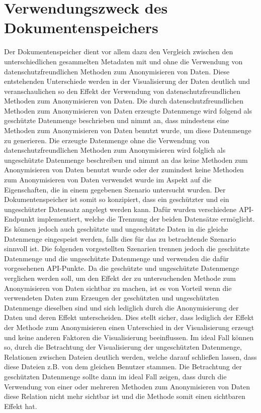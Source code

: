 \documentclass[
    fontsize=12pt,
    headings=small,
    parskip=half,           %
    bibliography=totoc,
    numbers=noenddot,       %
    open=any,               %
    ]{scrreprt}
\begin{document}
\section{Verwendungszweck des Dokumentenspeichers}
Der Dokumentenspeicher dient vor allem dazu den Vergleich zwischen den unterschiedlichen gesammelten Metadaten mit und ohne die Verwendung von datenschutzfreundlichen Methoden zum Anonymisieren von Daten. 
Diese entstehenden Unterschiede werden in der Visualisierung der Daten deutlich und veranschaulichen so den Effekt der Verwendung von datenschutzfreundlichen Methoden zum Anonymisieren von Daten.
Die durch datenschutzfreundlichen Methoden zum Anonymisieren von Daten erzeugte Datenmenge wird folgend als geschützte Datenmenge beschrieben und nimmt an, dass mindestens eine Methoden zum Anonymisieren von Daten benutzt wurde, um diese Datenmenge zu generieren. 
Die erzeugte Datenmenge ohne die Verwendung von datenschutzfreundlichen Methoden zum Anonymisieren wird folglich als ungeschützte Datenmenge beschreiben und nimmt an das keine Methoden zum Anonymisieren von Daten benutzt wurde oder der zumindest keine Methoden zum Anonymisieren von Daten verwendet wurde im Aspekt auf die Eigenschaften, die in einem gegebenen Szenario untersucht wurden.
Der Dokumentenspeicher ist somit so konzipiert, dass ein geschützter und ein ungeschützter Datensatz angelegt werden kann. 
Dafür wurden verschiedene API-Endpunkt implementiert, welche die Trennung der beiden Datensätze ermöglicht. 
Es können jedoch auch geschützte und ungeschützte Daten in die gleiche Datenmenge eingespeist werden, falls dies für das zu betrachtende Szenario sinnvoll ist. 
Die folgenden vorgestellten Szenarien trennen jedoch die geschützte Datenmenge und die ungeschützte Datenmenge und verwenden die dafür vorgesehenen API-Punkte.
Da die geschützte und ungeschützte Datenmenge verglichen werden soll, um den Effekt der zu untersuchenden Methode zum Anonymisieren von Daten sichtbar zu machen, ist es von Vorteil wenn die verwendeten Daten zum Erzeugen der geschützten und ungeschützten Datenmenge dieselben sind und sich lediglich durch die Anonymisierung der Daten und deren Effekt unterscheiden.
Dies stellt sicher, dass lediglich der Effekt der Methode zum Anonymisieren einen Unterschied in der Visualisierung erzeugt und keine anderen Faktoren die Visualisierung beeinflussen.
Im ideal Fall können so, durch die Betrachtung der Visualisierung der ungeschützten Datenmenge, Relationen zwischen Dateien deutlich werden, welche darauf schließen lassen, dass diese Dateien z.B. von dem gleichen Benutzer stammen.
Die Betrachtung der geschützten Datenmenge sollte dann im ideal Fall zeigen, dass durch die Verwendung von einer oder mehreren Methoden zum Anonymisieren von Daten diese Relation nicht mehr sichtbar ist und die Methode somit einen sichtbaren Effekt hat.
\end{document}
